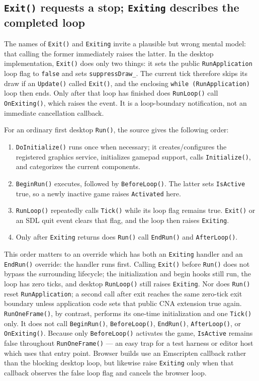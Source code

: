 \subsection{\texttt{Exit()} requests a stop; \texttt{Exiting} describes the completed loop}

The names of \texttt{Exit()} and \texttt{Exiting} invite a plausible but wrong mental model: that
calling the former immediately raises the latter. In the desktop implementation, \texttt{Exit()}
does only two things: it sets the public \texttt{RunApplication} loop flag to \texttt{false} and
sets \texttt{suppressDraw\_}. The current tick therefore skips its draw if an \texttt{Update()}
called \texttt{Exit()}, and the enclosing \texttt{while (RunApplication)} loop then ends. Only
after that loop has finished does \texttt{RunLoop()} call \texttt{OnExiting()}, which raises the
event. It is a loop-boundary notification, not an immediate cancellation callback.

For an ordinary first desktop \texttt{Run()}, the source gives the following order:

\begin{enumerate}
  \item \texttt{DoInitialize()} runs once when necessary; it creates/configures the registered
    graphics service, initializes gamepad support, calls \texttt{Initialize()}, and categorizes
    the current components.
  \item \texttt{BeginRun()} executes, followed by \texttt{BeforeLoop()}. The latter sets
    \texttt{IsActive} true, so a newly inactive game raises \texttt{Activated} here.
  \item \texttt{RunLoop()} repeatedly calls \texttt{Tick()} while its loop flag remains true.
    \texttt{Exit()} or an SDL quit event clears that flag, and the loop then raises
    \texttt{Exiting}.
  \item Only after \texttt{Exiting} returns does \texttt{Run()} call \texttt{EndRun()} and
    \texttt{AfterLoop()}.
\end{enumerate}

This order matters to an override which has both an \texttt{Exiting} handler and an
\texttt{EndRun()} override: the handler runs first. Calling \texttt{Exit()} before \texttt{Run()}
does not bypass the surrounding lifecycle; the initialization and begin hooks still run, the
loop has zero ticks, and desktop \texttt{RunLoop()} still raises \texttt{Exiting}. Nor does
\texttt{Run()} reset \texttt{RunApplication}; a second call after exit reaches the same
zero-tick exit boundary unless application code sets that public CNA extension true again.
\texttt{RunOneFrame()}, by contrast, performs its one-time initialization and one \texttt{Tick()}
only. It does not call \texttt{BeginRun()}, \texttt{BeforeLoop()}, \texttt{EndRun()},
\texttt{AfterLoop()}, or \texttt{OnExiting()}. Because only \texttt{BeforeLoop()} activates the
game, \texttt{IsActive} remains false throughout \texttt{RunOneFrame()} --- an easy trap for a
test harness or editor host which uses that entry point. Browser builds use an Emscripten callback rather
than the blocking desktop loop, but likewise raise \texttt{Exiting} only when that callback
observes the false loop flag and cancels the browser loop.

